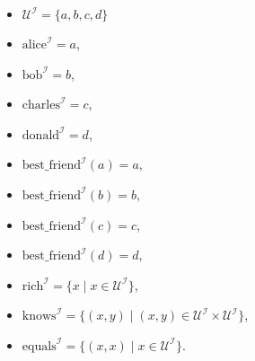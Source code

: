 \documentclass{acAssignment}
\begin{document}
\begin{enumerate}
        \begin{acSolution}
            \begin{itemize}
                \item $\mathcal{U}^\mathcal{I} = \{a, b, c, d\}$
                \item $\mathrm{alice}^\mathcal{I} = a$,
                \item $\mathrm{bob}^\mathcal{I} = b$,
                \item $\mathrm{charles}^\mathcal{I} = c$,
                \item $\mathrm{donald}^\mathcal{I} = d$,
                \item $\mathrm{best\_friend}^\mathcal{I}(a) = a$,
                \item $\mathrm{best\_friend}^\mathcal{I}(b) = b$,
                \item $\mathrm{best\_friend}^\mathcal{I}(c) = c$,
                \item $\mathrm{best\_friend}^\mathcal{I}(d) = d$,
                \item $\mathrm{rich}^\mathcal{I} = \{x \mid x \in \mathcal{U}^\mathcal{I}\}$,
                \item $\mathrm{knows}^\mathcal{I} = \{(x,y) \mid (x, y) \in \mathcal{U}^\mathcal{I} \times \mathcal{U}^\mathcal{I}\}$,
                \item $\mathrm{equals}^\mathcal{I} = \{(x, x) \mid x \in \mathcal{U}^\mathcal{I}\}$.
            \end{itemize}
        \end{acSolution}
\end{enumerate}
\end{document}
